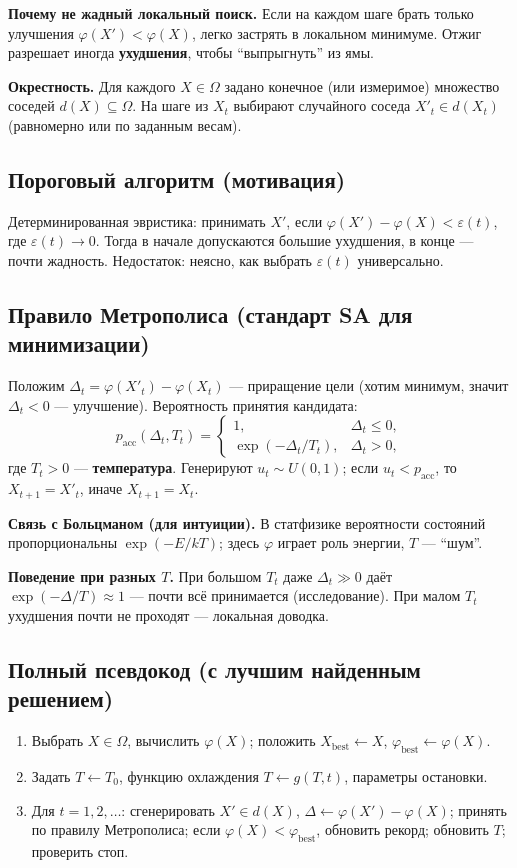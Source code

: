 \documentclass[12pt,a4paper]{article}
\begin{document}
\textbf{Почему не жадный локальный поиск.} Если на каждом шаге брать только улучшения \(\varphi(X')<\varphi(X)\), легко застрять в локальном минимуме. Отжиг разрешает иногда \textbf{ухудшения}, чтобы ``выпрыгнуть'' из ямы.

\textbf{Окрестность.} Для каждого \(X\in\Omega\) задано конечное (или измеримое) множество соседей \(d(X)\subseteq\Omega\). На шаге из \(X_t\) выбирают случайного соседа \(X'_t\in d(X_t)\) (равномерно или по заданным весам).

\subsection{Пороговый алгоритм (мотивация)}
Детерминированная эвристика: принимать \(X'\), если \(\varphi(X')-\varphi(X)<\varepsilon(t)\), где \(\varepsilon(t)\to0\). Тогда в начале допускаются большие ухудшения, в конце --- почти жадность. Недостаток: неясно, как выбрать \(\varepsilon(t)\) универсально.

\subsection{Правило Метрополиса (стандарт SA для минимизации)}
Положим \(\Delta_t=\varphi(X'_t)-\varphi(X_t)\) --- приращение цели (хотим минимум, значит \(\Delta_t<0\) --- улучшение). Вероятность принятия кандидата:
\[
  p_{\mathrm{acc}}(\Delta_t,T_t)=
  \begin{cases}
    1, & \Delta_t\le 0,\\[2mm]
    \exp(-\Delta_t/T_t), & \Delta_t>0,
  \end{cases}
\]
где \(T_t>0\) --- \textbf{температура}. Генерируют \(u_t\sim U(0,1)\); если \(u_t<p_{\mathrm{acc}}\), то \(X_{t+1}=X'_t\), иначе \(X_{t+1}=X_t\).

\textbf{Связь с Больцманом (для интуиции).} В статфизике вероятности состояний пропорциональны \(\exp(-E/kT)\); здесь \(\varphi\) играет роль энергии, \(T\) --- ``шум''.

\textbf{Поведение при разных \(T\).} При большом \(T_t\) даже \(\Delta_t\gg0\) даёт \(\exp(-\Delta/T)\approx 1\) --- почти всё принимается (исследование). При малом \(T_t\) ухудшения почти не проходят --- локальная доводка.

\subsection{Полный псевдокод (с лучшим найденным решением)}
\begin{enumerate}
  \item Выбрать \(X\in\Omega\), вычислить \(\varphi(X)\); положить \(X_{\mathrm{best}}\leftarrow X\), \(\varphi_{\mathrm{best}}\leftarrow\varphi(X)\).
  \item Задать \(T\leftarrow T_0\), функцию охлаждения \(T\leftarrow g(T,t)\), параметры остановки.
  \item Для \(t=1,2,\ldots\): сгенерировать \(X'\in d(X)\), \(\Delta\leftarrow\varphi(X')-\varphi(X)\); принять по правилу Метрополиса; если \(\varphi(X)<\varphi_{\mathrm{best}}\), обновить рекорд; обновить \(T\); проверить стоп.
\end{enumerate}
\end{document}
